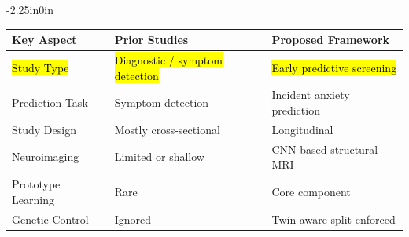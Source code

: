 \documentclass[10pt,letterpaper]{article}
\begin{document}
\begin{table}[!t]
\begin{adjustwidth}{-2.25in}{0in}
                                                                                                                          \begin{tabular}{|p{5.0cm}|p{5.5cm}|p{5.5cm}|}
                                                                                                                          \hline
                                                                                                                          \textbf{Key Aspect} & \textbf{Prior Studies} & \textbf{Proposed Framework} \\
                                                                                                                          \hline
                                                                                                                          \hl{Study Type} & \hl{Diagnostic / symptom detection} & \hl{Early predictive screening} \\
                                                                                                                          \hline
                                                                                                                          Prediction Task & Symptom detection & Incident anxiety prediction \\
                                                                                                                          \hline
                                                                                                                          Study Design & Mostly cross-sectional & Longitudinal \\
                                                                                                                          \hline
                                                                                                                          Neuroimaging & Limited or shallow & CNN-based structural MRI \\
                                                                                                                          \hline
                                                                                                                          Prototype Learning & Rare & Core component \\
                                                                                                                          \hline
                                                                                                                          Genetic Control & Ignored & Twin-aware split enforced \\

\end{tabular}
\end{adjustwidth}
\end{table}
\end{document}
